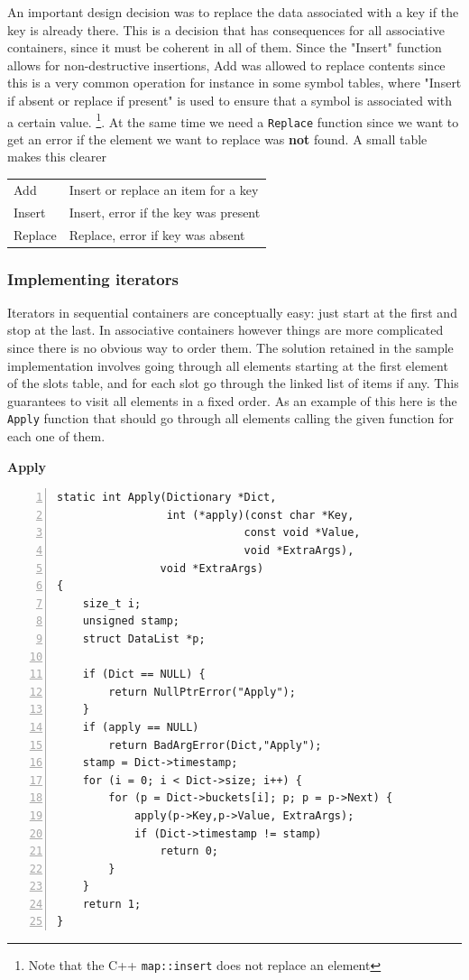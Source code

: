 \documentclass[12pt,a4paper,openany]{memoir} %
\newif\iftth
\newcommand{\container}{}
\newcommand{\function}[1] {%
\vspace{0.2in}
\par\noindent
\textbf{#1}\index{#1!code for \container} \hrulefill
\iftth\else
\nopagebreak
\fi
\noindent\begin{Verbatim}[numbers=left, xleftmargin=7mm]}
\begin{document}
{{An important design decision was to replace the data associated with a key if the key is already there. This is a decision that has consequences for 
all associative containers, since it must be coherent in all of them. Since the "Insert" function allows for non-destructive insertions, Add was
allowed to replace contents since this is a very common operation for instance in some symbol tables, where "Insert if absent or replace if present"
is used to ensure that a symbol is associated with a certain value. \footnote{Note that the C++ \texttt{map::insert} does not replace an element}. At the same time we need a \texttt{Replace} function since we want to get an error if the element we want to replace was \textbf{not} found.
A small table makes this clearer
\par %\vspace{0.5cm}
\begin{center}
\begin{tabular}{|l | l|}
\hline 
Add & Insert or replace an item for a key \\
Insert & Insert, error if the key was present \\
Replace & Replace, error if key was absent \\
\hline
\end{tabular}
\end{center}

\subsubsection{Implementing iterators}
Iterators in sequential containers are conceptually easy: just start at the first and stop at the last. In associative containers however things are 
more complicated since there is no obvious way to order them. The solution retained in the sample implementation involves going through all elements
starting at the first element of the slots table, and for each slot go through the linked list of items if any. This guarantees to visit all elements 
in a fixed order. As an example of this here is the \texttt{Apply} function that should go through all elements calling the given function for each 
one of them.
\function{Apply}
static int Apply(Dictionary *Dict,
                 int (*apply)(const char *Key,
                             const void *Value, 
                             void *ExtraArgs),
                void *ExtraArgs)
{
    size_t i;
    unsigned stamp;
    struct DataList *p;

    if (Dict == NULL) {
        return NullPtrError("Apply");
    }
    if (apply == NULL)
        return BadArgError(Dict,"Apply");
    stamp = Dict->timestamp;
    for (i = 0; i < Dict->size; i++) {
        for (p = Dict->buckets[i]; p; p = p->Next) {
            apply(p->Key,p->Value, ExtraArgs);
            if (Dict->timestamp != stamp)
                return 0;
        }
    }
    return 1;
}
\end{Verbatim}

}}
\end{document}
